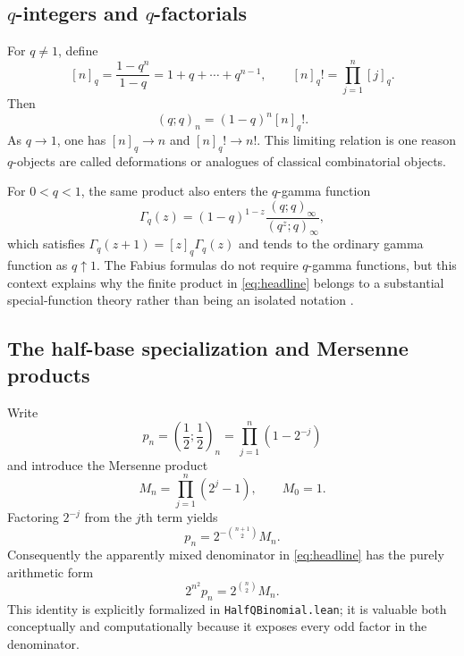 \documentclass[11pt,oneside]{article}
\theoremstyle{definition}
\theoremstyle{remark}
\newcommand{\qpoch}[3]{\left(#1;#2\right)_{#3}}
\begin{document}
\subsection{\texorpdfstring{$q$-integers and $q$-factorials}{q-integers and q-factorials}}

For $q\ne1$, define
\begin{equation}\label{eq:qinteger}
 [n]_q=\frac{1-q^n}{1-q}=1+q+\cdots+q^{n-1},
 \qquad
 [n]_q!=\prod_{j=1}^{n}[j]_q.
\end{equation}
Then
\begin{equation}\label{eq:qfactorialpoch}
 \qpoch{q}{q}{n}=(1-q)^n[n]_q!.
\end{equation}
As $q\to1$, one has $[n]_q\to n$ and $[n]_q!\to n!$.  This limiting relation is one reason $q$-objects are called deformations or analogues of classical combinatorial objects.

For $0<q<1$, the same product also enters the $q$-gamma function
\begin{equation}\label{eq:qgamma}
 \Gamma_q(z)=(1-q)^{1-z}
 \frac{\qpoch{q}{q}{\infty}}{\qpoch{q^z}{q}{\infty}},
\end{equation}
which satisfies $\Gamma_q(z+1)=[z]_q\Gamma_q(z)$ and tends to the ordinary gamma function as $q\uparrow1$.  The Fabius formulas do not require $q$-gamma functions, but this context explains why the finite product in \eqref{eq:headline} belongs to a substantial special-function theory rather than being an isolated notation \cite{DLMF17,GasperRahman,KacCheung}.

\subsection{The half-base specialization and Mersenne products}

Write
\begin{equation}\label{eq:pn}
 p_n=\qpoch{\frac12}{\frac12}{n}
     =\prod_{j=1}^{n}(1-2^{-j})
\end{equation}
and introduce the Mersenne product
\begin{equation}\label{eq:Mn}
 M_n=\prod_{j=1}^{n}(2^j-1),
 \qquad M_0=1.
\end{equation}
Factoring $2^{-j}$ from the $j$th term yields
\begin{equation}\label{eq:pMersenne}
 \boxed{
 p_n=2^{-\binom{n+1}{2}}M_n.}
\end{equation}
Consequently the apparently mixed denominator in \eqref{eq:headline} has the purely arithmetic form
\begin{equation}\label{eq:fullDenM}
 \boxed{
 2^{n^2}p_n=2^{\binom n2}M_n.}
\end{equation}
This identity is explicitly formalized in \texttt{HalfQBinomial.lean}; it is valuable both conceptually and computationally because it exposes every odd factor in the denominator.
\end{document}
